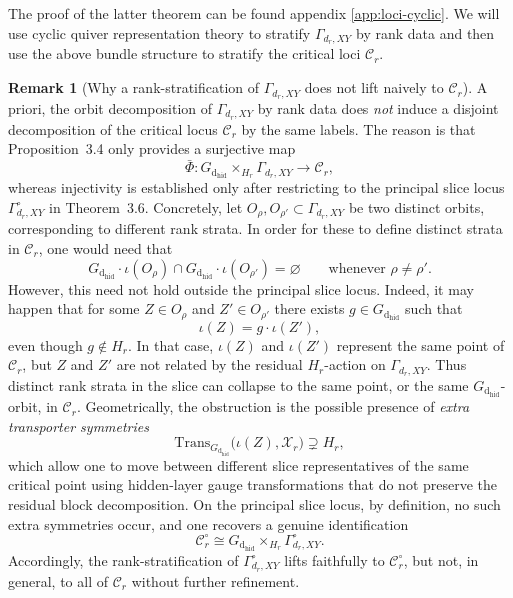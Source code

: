 \documentclass{article}
\newcommand{\dhid}{\operatorname{d_{hid}}}
\theoremstyle{definition}
\newtheorem{remark}[theorem]{Remark}
\begin{document}
\noindent
The proof of the latter theorem can be found appendix \ref{app:loci-cyclic}.
We will use cyclic quiver representation theory to stratify $\Gamma_{d_r,XY}$ by rank data and then use the above bundle structure to stratify the critical loci $\mathcal C_r$.
\begin{remark}[Why a rank-stratification of $\Gamma_{d_r,XY}$ does not lift naively to $\mathcal C_r$]
A priori, the orbit decomposition of $\Gamma_{d_r,XY}$ by rank data does \emph{not} induce a disjoint decomposition of the critical locus $\mathcal C_r$ by the same labels. The reason is that Proposition~3.4 only provides a surjective map
\[
\bar\Phi \colon G_{\dhid} \times_{H_{r}} \Gamma_{d_r,XY} \longrightarrow \mathcal C_r,
\]
whereas injectivity is established only after restricting to the principal slice locus $\Gamma^\circ_{d_r,XY}$ in Theorem~3.6.
\noindent
Concretely, let $O_{\rho}, O_{\rho'} \subset \Gamma_{d_r,XY}$ be two distinct orbits, corresponding to different rank strata. In order for these to define distinct strata in $\mathcal C_r$, one would need that
\[
G_{\dhid} \cdot \iota(O_{\rho}) \cap G_{\dhid} \cdot \iota(O_{\rho'}) = \varnothing
\qquad\text{whenever } \rho \neq \rho'.
\]
However, this need not hold outside the principal slice locus. Indeed, it may happen that for some
$Z \in O_{\rho}$ and $Z' \in O_{\rho'}$ there exists $g \in G_{\dhid}$ such that
\[
\iota(Z) = g \cdot \iota(Z'),
\]
even though $g \notin H_{r}$. In that case, $\iota(Z)$ and $\iota(Z')$ represent the same point of
$\mathcal C_r$, but $Z$ and $Z'$ are not related by the residual $H_{r}$-action on $\Gamma_{d_r,XY}$.
Thus distinct rank strata in the slice can collapse to the same point, or the same $G_{\dhid}$-orbit, in
$\mathcal C_r$.
\noindent
Geometrically, the obstruction is the possible presence of \emph{extra transporter symmetries}
\[
\mathrm{Trans}_{G_{\dhid}}\!\bigl(\iota(Z), \mathcal{X}_r\bigr) \supsetneq H_{r},
\]
which allow one to move between different slice representatives of the same critical point using
hidden-layer gauge transformations that do not preserve the residual block decomposition. On the
principal slice locus, by definition, no such extra symmetries occur, and one recovers a genuine
identification
\[
\mathcal C_r^\circ \cong G_{\dhid} \times_{H_{r}} \Gamma^\circ_{d_r,XY}.
\]
Accordingly, the rank-stratification of $\Gamma^\circ_{d_r,XY}$ lifts faithfully to $\mathcal C_r^\circ$,
but not, in general, to all of $\mathcal C_r$ without further refinement.
\end{remark}
\noindent

\end{document}
